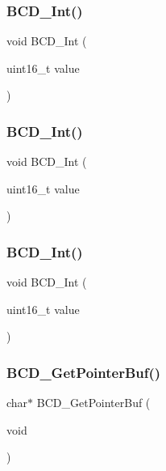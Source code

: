 \mbox{\label{lcd_8h_ac90bf7d17031c7d3c47b68e80fb251be}} 
\subsubsection{B\+C\+D\+\_\+Int()}
{\footnotesize\ttfamily void B\+C\+D\+\_\+Int (\begin{DoxyParamCaption}\item[{uint16\+\_\+t}]{value }\end{DoxyParamCaption})}

\mbox{\label{lcd_8h_a67578ffcce8e8fd0199734024cca71a8}} 
\subsubsection{B\+C\+D\+\_\+Int()}
{\footnotesize\ttfamily void B\+C\+D\+\_\+Int (\begin{DoxyParamCaption}\item[{uint16\+\_\+t}]{value }\end{DoxyParamCaption})}

\mbox{\label{lcd_8h_a19df9ccc086e0e23a07026bb020fec6c}} 
\subsubsection{B\+C\+D\+\_\+Int()}
{\footnotesize\ttfamily void B\+C\+D\+\_\+Int (\begin{DoxyParamCaption}\item[{uint16\+\_\+t}]{value }\end{DoxyParamCaption})}

\mbox{\label{lcd_8h_a60922d87234dfcc4050e1cde674d3c1c}} 
\subsubsection{B\+C\+D\+\_\+\+Get\+Pointer\+Buf()}
{\footnotesize\ttfamily char$\ast$ B\+C\+D\+\_\+\+Get\+Pointer\+Buf (\begin{DoxyParamCaption}\item[{void}]{ }\end{DoxyParamCaption})}

